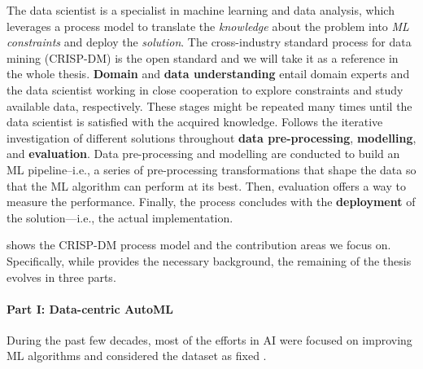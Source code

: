 The data scientist is a specialist in machine learning and data analysis, which leverages a process model to translate the \textit{knowledge} about the problem into \textit{ML constraints} and deploy the \textit{solution}.
The cross-industry standard process for data mining \cite{wirth2000crisp} (CRISP-DM) is the open standard and we will take it as a reference in the whole thesis.
\textbf{Domain} and \textbf{data understanding} entail domain experts and the data scientist working in close cooperation to explore constraints and study available data, respectively.
These stages might be repeated many times until the data scientist is satisfied with the acquired knowledge.
Follows the iterative investigation of different solutions throughout \textbf{data pre-processing}, \textbf{modelling}, and \textbf{evaluation}.
Data pre-processing and modelling are conducted to build an ML pipeline--i.e., a series of pre-processing transformations that shape the data so that the ML algorithm can perform at its best.
Then, evaluation offers a way to measure the performance.
Finally, the process concludes with the \textbf{deployment} of the solution---i.e., the actual implementation.

 shows the CRISP-DM process model and the contribution areas we focus on.
Specifically, while  provides the necessary background, the remaining of the thesis evolves in three parts.


\paragraph{Part I: Data-centric AutoML}

During the past few decades, most of the efforts in AI were focused on improving ML algorithms and considered the dataset as fixed .

